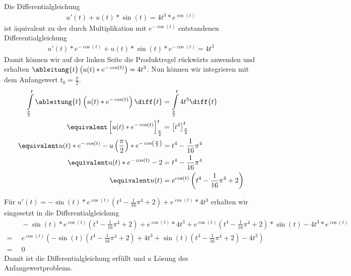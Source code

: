 \begin{exercisePage}
	Die Differentialgleichung 
	\begin{align} \label{eq: diffgleichungd}
	u'(t) + u(t) * \sin(t) = 4t^3*e^{\cos(t)}
	\end{align}
	ist äquivalent zu der durch Multiplikation mit $e^{-\cos(t)}$ entstandenen Differentialgleichung 
	\begin{align*}
	u'(t) * e^{-\cos(t)} + u(t) * \sin(t) * e^{-\cos(t)} = 4t^3
	\end{align*}
	Damit können wir auf der linken Seite die Produktregel rückwärts anwenden und erhalten $\ableitung{t}  \left(u(t) * e^{-\cos(t)}\right) = 4t^3$. Nun können wir integrieren mit dem Anfangswert $t_0 = \frac{\pi}{2}$.
	\begin{align*}
	\int\limits_{\frac{\pi}{2}}^t {\ableitung{t}  \left( u(t) * e^{-\cos(t)}\right) \diff{t} }  &= \int\limits_{\frac{\pi}{2}}^t{4t^3 \diff{t}} \\
	\equivalent \left[ u(t) * e^{-\cos(t)} \right]_{\frac{\pi}{2}}^t &= \left[ t^4 \right]_{\frac{\pi}{2}}^t \\
	\equivalent u(t) * e^{-\cos(t)} - u\left(\frac{\pi}{2} \right) * e^{-\cos\left( \frac{\pi}{2}\right)} &= t^4 - \frac{1}{16} \pi^4 \\
	\equivalent u(t) * e^{-\cos(t)} - 2 &= t^4 - \frac{1}{16} \pi^4 \\
	\equivalent u(t) &= e^{\cos(t)} \left( t^4 - \frac{1}{16} \pi^4 + 2 \right)
	\end{align*}
	
	Für $u'(t) = -\sin(t) * e^{\cos(t)} \left( t^4 - \frac{1}{16} \pi^4 + 2 \right) + e^{\cos(t)} * 4t^3$ erhalten wir eingesetzt in die Differentialgleichung
	\begin{align*}
	& \enspace -\sin(t) * e^{\cos(t)} \left( t^4 - \frac{1}{16} \pi^4 + 2 \right) + e^{\cos(t)} * 4t^3 + e^{\cos(t)} \left( t^4 - \frac{1}{16} \pi^4 + 2 \right) * \sin(t) - 4t^3 * e^{\cos(t)} \\
	= &\enspace e^{\cos(t)} \left( -\sin(t) \left( t^4 - \frac{1}{16} \pi^4 + 2 \right) + 4t^3 + \sin(t)  \left( t^4 - \frac{1}{16} \pi^4 + 2 \right) - 4t^3  \right) \\
	= &\enspace 0
	\end{align*}
	Damit ist die Differentialgleichung  erfüllt und $u$ Lösung des Anfangswertproblems.
	

\end{exercisePage}
